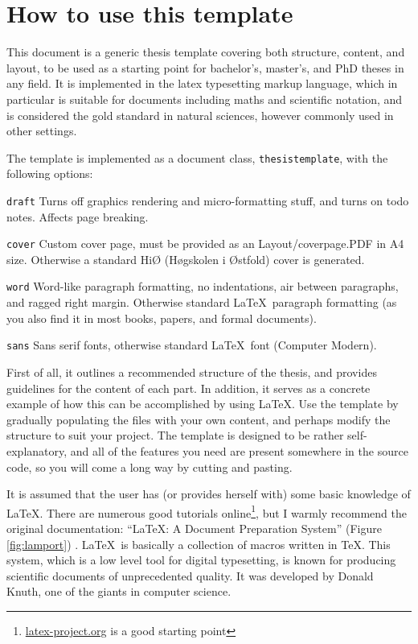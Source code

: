 \chapter{How to use this template}
\label{chap:how-to} 

This document is a generic thesis template covering both structure, content, and layout, to be used as a starting point for bachelor's, master's, and PhD theses in any field. 
It is implemented in the \gls{latex} typesetting markup language, which in particular is suitable 
for documents including \gls{maths} 
and scientific notation, and is considered the gold standard in natural sciences, however commonly used in other settings.

The template is implemented as a document class, 
\texttt{thesistemplate}, with the following options:

\begin{compactdesc}
\item [\texttt{draft}] Turns off graphics rendering and micro-formatting stuff, and turns on todo notes. Affects page breaking.
\item [\texttt{cover}] Custom cover page, must be provided as an Layout/coverpage.PDF in A4 size. Otherwise a standard HiØ (Høgskolen i Østfold) cover is generated.
\item [\texttt{word}] Word-like paragraph formatting, no indentations, air between paragraphs, and ragged right margin. Otherwise standard \LaTeX\ paragraph formatting (as you also find it in most books, papers, and formal documents).
\item [\texttt{sans}] Sans serif fonts, otherwise standard \LaTeX\ font (Computer Modern).
\end{compactdesc}

First of all, it outlines a recommended structure of the thesis, and provides guidelines for the content of each part.
In addition, it serves as a concrete example of how this can be accomplished by using \LaTeX. Use the template by gradually populating the files with your own content, and perhaps modify the structure to suit your project. The template is designed to be rather self-explanatory, and all of the features you need are present somewhere in the source code, so you will come a long way by cutting and pasting.

It is assumed that the user has (or provides herself with) some basic knowledge of \LaTeX. There are numerous good tutorials online\footnote{\url{latex-project.org} is a good starting point}, but I warmly recommend the original documentation: ``\LaTeX: A Document Preparation System'' (Figure \ref{fig:lamport})  \cite{lamport94ldp}. \LaTeX\ is basically a collection of macros written in \TeX.
This system, which is a low level tool for digital typesetting, is known for producing scientific documents of unprecedented quality. It was developed by Donald Knuth, one of the giants in computer science.

